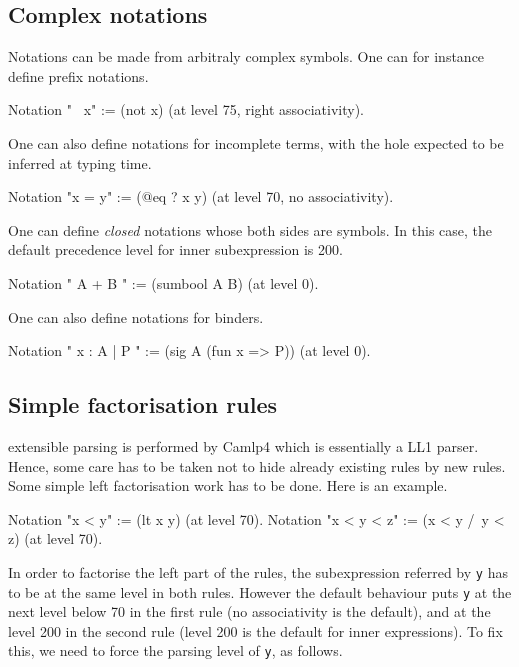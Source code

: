 \subsection{Complex notations}

Notations can be made from arbitraly complex symbols. One can for
instance define prefix notations.

\begin{coq_example*}
Notation "~ x" := (not x) (at level 75, right associativity).
\end{coq_example*}

One can also define notations for incomplete terms, with the hole
expected to be inferred at typing time.

\begin{coq_example*}
Notation "x = y" := (@eq ? x y) (at level 70, no associativity).
\end{coq_example*}

One can define {\em closed} notations whose both sides are symbols. In
this case, the default precedence level for inner subexpression is 200.

\begin{coq_example*}
Notation "{ A } + { B }" := (sumbool A B) (at level 0).
\end{coq_example*}

One can also define notations for binders.

\begin{coq_example*}
Notation "{ x : A  |  P }" := (sig A (fun x => P)) (at level 0).
\end{coq_example*}

\subsection{Simple factorisation rules}

{\Coq} extensible parsing is performed by Camlp4 which is essentially a
LL1 parser. Hence, some care has to be taken not to hide already
existing rules by new rules. Some simple left factorisation work has
to be done. Here is an example.

\begin{coq_example*}
Notation "x < y"     := (lt x y) (at level 70).
Notation "x < y < z" := (x < y /\ y < z) (at level 70).
\end{coq_example*}

In order to factorise the left part of the rules, the subexpression
referred by {\tt y} has to be at the same level in both rules. However
the default behaviour puts {\tt y} at the next level below 70
in the first rule (no associativity is the default), and at the level
200 in the second rule (level 200 is the default for inner expressions).
To fix this, we need to force the parsing level of {\tt y},
as follows.


